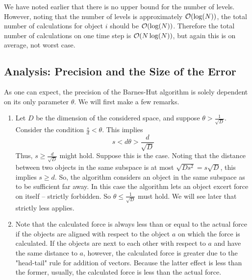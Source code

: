 We have noted earlier that there is no upper bound for the number of levels. However, noting that the number of levels is approximately $\mathcal{O}(\log(N))$, the total number of calculations for object $i$ should be $\mathcal{O}(\log(N))$. Therefore the total number of calculations on one time step is $\mathcal{O}(N\log(N))$, but again this is on average, not worst case.
\subsection{Analysis: Precision and the Size of the Error}
As one can expect, the precision of the Barnes-Hut algorithm is solely dependent on its only parameter $\theta$. We will first make a few remarks.
\begin{enumerate}
\item\label{maxparameter} Let $D$ be the dimension of the considered space, and suppose $\theta > \frac{1}{\sqrt{D}}$. Consider the condition $\frac{s}{d} < \theta$. This implies
\[
s < d\theta > \frac{d}{\sqrt{D}}
\]
Thus, $s\geq \frac{d}{\sqrt{D}}$ might hold. Suppose this is the case. Noting that the distance between two objects in the same subspace is at most $\sqrt{Ds^2} = s\sqrt{D}$, this implies $s\geq d$. So, the algorithm considers an object in the same subspace as to be sufficient far away. In this case the algorithm lets an object excert force on itself -- strictly forbidden. So $\theta \leq \frac{1}{\sqrt{D}}$ must hold. We will see later that strictly less applies.
\item\label{forceless} Note that the calculated force is always less than or equal to the actual force if the objects are aligned with respect to the object $a$ on which the force is calculated. If the objects are next to each other with respect to $a$ and have the same distance to $a$, however, the calculated force is greater due to the "head-tail" rule for addition of vectors. Because the latter effect is less than the former, usually, the calculated force is less than the actual force.


\end{enumerate}
